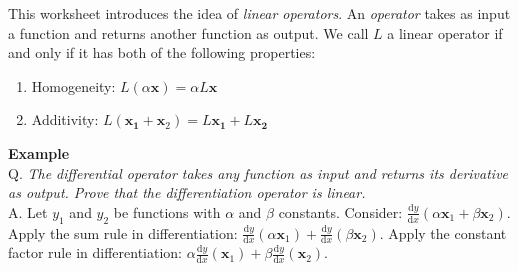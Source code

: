 This worksheet introduces the idea of {\em linear operators}. An {\em operator} takes as input a function and returns another function as output. We call $L$ a linear operator if and only if it has both of the following properties:
\begin{enumerate}
\item Homogeneity: $L(\alpha\mathbf{x})=\alpha L\mathbf{x}$
\item Additivity: $L(\mathbf{x_{1}}+{\mathbf{x}_{2}})=L\mathbf{x_{1}}+L\mathbf{x_{2}}$
\end{enumerate}

{\bf Example}\\
Q. {\em The differential operator takes any function as input and returns its derivative as output. Prove that the differentiation operator is linear.} \\
A. Let $y_{1}$ and $y_{2}$ be functions with $\alpha$ and $\beta$ constants. Consider: $\frac{\text{d}y}{\text{d}x}(\alpha \mathbf{x}_{1}+\beta \mathbf{x}_{2})$. \\
Apply the sum rule in differentiation: $\frac{\text{d}y}{\text{d}x}(\alpha \mathbf{x}_{1})+\frac{\text{d}y}{\text{d}x}(\beta \mathbf{x}_{2})$. Apply the constant factor rule in differentiation: $\alpha \frac{\text{d}y}{\text{d}x}(\mathbf{x}_{1})+\beta \frac{\text{d}y}{\text{d}x}(\mathbf{x}_{2})$.\\
